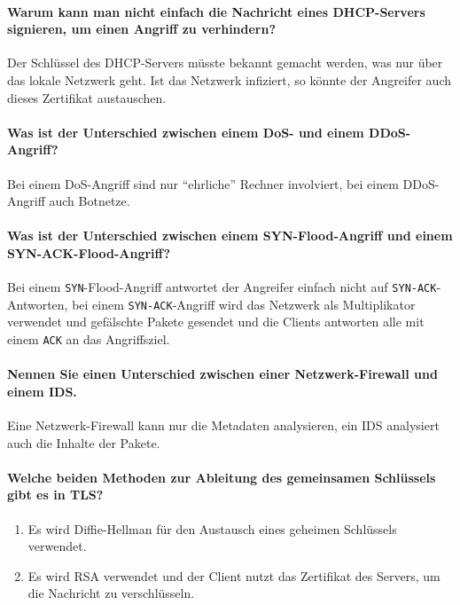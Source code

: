 \documentclass[a4paper, 11pt, accentcolor = tud3b]{tudreport}
\begin{document}
			\paragraph{Warum kann man nicht einfach die Nachricht eines DHCP-Servers signieren, um einen Angriff zu verhindern?}
			Der Schlüssel des DHCP-Servers müsste bekannt gemacht werden, was nur über das lokale Netzwerk geht. Ist das Netzwerk infiziert, so könnte der Angreifer auch dieses Zertifikat austauschen.
			
			\paragraph{Was ist der Unterschied zwischen einem DoS- und einem DDoS-Angriff?}
			Bei einem DoS-Angriff sind nur \enquote{ehrliche} Rechner involviert, bei einem DDoS-Angriff auch Botnetze.
			
			\paragraph{Was ist der Unterschied zwischen einem SYN-Flood-Angriff und einem SYN-ACK-Flood-Angriff?}
			Bei einem \texttt{SYN}-Flood-Angriff antwortet der Angreifer einfach nicht auf \texttt{SYN-ACK}-Antworten, bei einem \texttt{SYN-ACK}-Angriff wird das Netzwerk als Multiplikator verwendet und gefälschte Pakete gesendet und die Clients antworten alle mit einem \texttt{ACK} an das Angriffsziel.
			
			\paragraph{Nennen Sie einen Unterschied zwischen einer Netzwerk-Firewall und einem IDS.}
			Eine Netzwerk-Firewall kann nur die Metadaten analysieren, ein IDS analysiert auch die Inhalte der Pakete.
			
			\paragraph{Welche beiden Methoden zur Ableitung des gemeinsamen Schlüssels gibt es in TLS?}
			\begin{enumerate}
				\item Es wird Diffie-Hellman für den Austausch eines geheimen Schlüssels verwendet.
				\item Es wird RSA verwendet und der Client nutzt das Zertifikat des Servers, um die Nachricht zu verschlüsseln.
			\end{enumerate}
			
\end{document}
